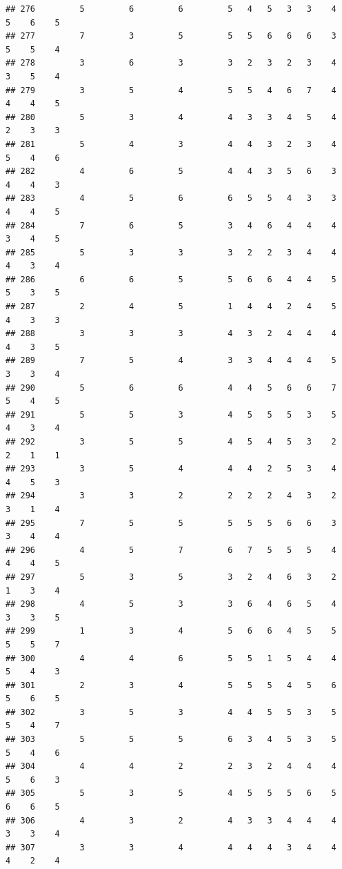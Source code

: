 \documentclass[
]{article}
\begin{document}
\begin{verbatim}
## 276         5         6         6         5   4   5   3   3    4    5    6    5
## 277         7         3         5         5   5   6   6   6    3    5    5    4
## 278         3         6         3         3   2   3   2   3    4    3    5    4
## 279         3         5         4         5   5   4   6   7    4    4    4    5
## 280         5         3         4         4   3   3   4   5    4    2    3    3
## 281         5         4         3         4   4   3   2   3    4    5    4    6
## 282         4         6         5         4   4   3   5   6    3    4    4    3
## 283         4         5         6         6   5   5   4   3    3    4    4    5
## 284         7         6         5         3   4   6   4   4    4    3    4    5
## 285         5         3         3         3   2   2   3   4    4    4    3    4
## 286         6         6         5         5   6   6   4   4    5    5    3    5
## 287         2         4         5         1   4   4   2   4    5    4    3    3
## 288         3         3         3         4   3   2   4   4    4    4    3    5
## 289         7         5         4         3   3   4   4   4    5    3    3    4
## 290         5         6         6         4   4   5   6   6    7    5    4    5
## 291         5         5         3         4   5   5   5   3    5    4    3    4
## 292         3         5         5         4   5   4   5   3    2    2    1    1
## 293         3         5         4         4   4   2   5   3    4    4    5    3
## 294         3         3         2         2   2   2   4   3    2    3    1    4
## 295         7         5         5         5   5   5   6   6    3    3    4    4
## 296         4         5         7         6   7   5   5   5    4    4    4    5
## 297         5         3         5         3   2   4   6   3    2    1    3    4
## 298         4         5         3         3   6   4   6   5    4    3    3    5
## 299         1         3         4         5   6   6   4   5    5    5    5    7
## 300         4         4         6         5   5   1   5   4    4    5    4    3
## 301         2         3         4         5   5   5   4   5    6    5    6    5
## 302         3         5         3         4   4   5   5   3    5    5    4    7
## 303         5         5         5         6   3   4   5   3    5    5    4    6
## 304         4         4         2         2   3   2   4   4    4    5    6    3
## 305         5         3         5         4   5   5   5   6    5    6    6    5
## 306         4         3         2         4   3   3   4   4    4    3    3    4
## 307         3         3         4         4   4   4   3   4    4    4    2    4

\end{verbatim}
\end{document}
